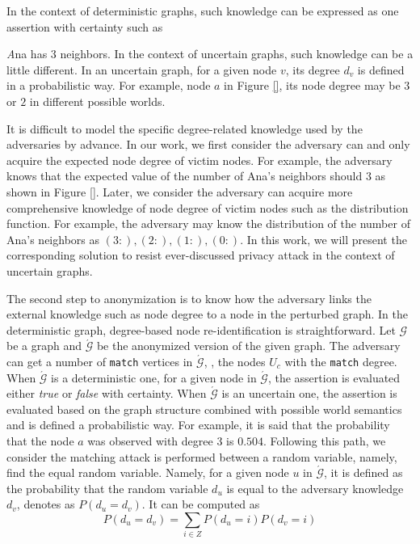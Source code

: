 In the context of deterministic graphs, such knowledge can be expressed as one assertion with certainty such as {\emph Ana has 3 neighbors. In the context of uncertain graphs, such knowledge can be a little different. In an uncertain graph, for a given node $v$, its degree $d_{v}$ is defined in a probabilistic way. For example, node $a$ in Figure \ref{}, its node degree may be $3$ or $2$ in different possible worlds. 

It is difficult to model the specific degree-related knowledge used by the adversaries by advance. In our work, we first consider the adversary can and only acquire the expected node degree of victim nodes. For example, the adversary knows that the expected value of the number of Ana's neighbors should $3$  as shown in Figure \ref{}.  Later, we consider the adversary can acquire more comprehensive knowledge of node degree of victim nodes such as the distribution function. For example, the adversary may know the distribution of the number of Ana's neighbors as ${(3:),(2:),(1:),(0:)}$. In this work, we will present the corresponding solution to resist ever-discussed privacy attack in the context of uncertain graphs. 

The second step to anonymization is to know how the adversary links the external knowledge such as node degree to a node in the perturbed graph. In the deterministic graph, degree-based node re-identification is straightforward. Let $\mathcal{G}$ be a graph and $\acute{\mathcal{G}}$  be the anonymized version of the given graph. The adversary can get a number of \texttt{match} vertices in $\acute{\mathcal{G}}$, {\ie}, the nodes $U_{c}$ with the \texttt{match} degree. When $\acute{\mathcal{G}}$ is a deterministic one, for a given node in $\acute{\mathcal{G}}$, the assertion is evaluated either \emph{true} or \emph{false} with certainty.  When $\acute{\mathcal{G}}$ is an uncertain one, the assertion is evaluated based on the graph structure combined with possible world semantics and is defined a probabilistic way. For example, it is said that the probability that the node $a$ was observed with degree $3$ is $0.504$. Following this path, we consider the matching attack is performed between a random variable, namely, find the equal random variable. Namely, for a given node $u$ in $\acute{\mathcal{G}}$, it is defined as the probability that the random variable $d_{u}$ is equal to the adversary knowledge $d_{v}$, denotes as $P(d_{u}=d_{v})$. It can be computed as 
\begin{equation}
    P(d_{u}=d_{v})= \sum_{i \in Z } P(d_{u}=i) P(d_{v}=i) 
\end{equation}

}
